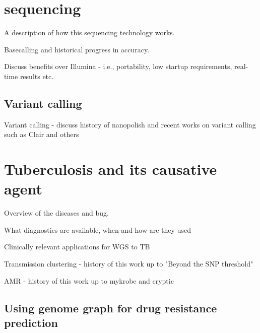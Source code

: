 \section{\ont{} sequencing}
\label{sec:intro-ont}
A description of how this sequencing technology works.

Basecalling and historical progress in accuracy. %

Discuss benefits over Illumina - i.e., portability, low startup requirements, real-time results etc.

\subsection{Variant calling}
\label{sec:ont-var-calling-intro}
Variant calling - discuss history of nanopolish and recent works on variant calling such as Clair and others

\section{Tuberculosis and its causative agent}

Overview of the diseases and bug.

What diagnostics are available, when and how are they used

Clinically relevant applications for WGS to TB

Transmission clustering - history of this work up to "Beyond the SNP threshold"

AMR - history of this work up to mykrobe and cryptic

\subsection{Using genome graph for drug resistance prediction}
\label{sec:genome-graphs-dst}

